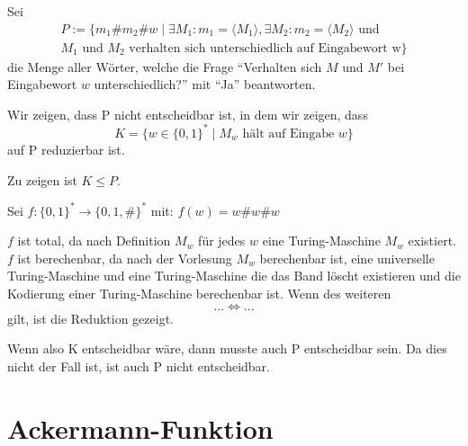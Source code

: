 \documentclass[10pt,leqno ]{article}
\begin{document}
Sei 
\begin{align*}
    P := \{ m_1 \# m_2 \# w \mid \exists M_1 : m_1 = \langle M_1 \rangle , \exists M_2 : m_2 = \langle M_2 \rangle \text{ und } \\ M_1 \text{ und } M_2 \text{ verhalten sich unterschiedlich auf Eingabewort w} \}
\end{align*}
die Menge aller Wörter, welche die Frage \enquote{Verhalten sich $M$ und $M'$ bei Eingabewort $w$ unterschiedlich?} mit \enquote{Ja} beantworten.

\begin{flushleft}
    Wir zeigen, dass P nicht entscheidbar ist, in dem wir zeigen, dass 
    \[ K = \{ w \in \{0,1 \}^* \mid M_w \text{ hält auf Eingabe } w \} \]
    auf P reduzierbar ist.
\end{flushleft}

\begin{flushleft}
    Zu zeigen ist $K \leq P$.
\end{flushleft}

\begin{flushleft}
    Sei $f: \{ 0, 1 \}^* \rightarrow \{ 0,1,\# \}^*$ mit: \( f(w) = w\#w\#w \)
\end{flushleft}

\begin{flushleft}
    $f$ ist total, da nach Definition $M_w$ für jedes $w$ eine Turing-Maschine $M_w$ existiert. $f$ ist berechenbar, da nach der Vorlesung $M_w$ berechenbar ist, eine universelle Turing-Maschine und eine Turing-Maschine die das Band löscht existieren und die Kodierung einer Turing-Maschine berechenbar ist.
    Wenn des weiteren
    \[... \Leftrightarrow ... \]
    gilt, ist die Reduktion gezeigt.
\end{flushleft}


\begin{flushleft}
    Wenn also K entscheidbar wäre, dann musste auch P entscheidbar sein. Da dies nicht der Fall ist, ist auch P nicht entscheidbar. 
\end{flushleft}

\pagebreak

\section{Ackermann-Funktion}
\end{document}
